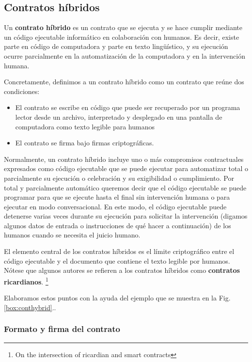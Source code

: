 \documentclass[12pt]{report} %
\begin{document}
\subsection{Contratos híbridos}
\label{hybridcont}

Un  \textbf{contrato híbrido} es un contrato que se ejecuta y se hace cumplir mediante un código ejecutable informático en colaboración con humanos. Es decir, existe parte en  código de computadora y parte en texto lingüístico, y su ejecución ocurre parcialmente en la automatización de la computadora y en la intervención humana.

Concretamente, definimos a un contrato híbrido como un contrato que reúne dos condiciones:

\begin{itemize}
    \item El contrato se escribe en código que puede ser recuperado por un programa lector desde un archivo, interpretado y desplegado en una pantalla de computadora como texto legible para humanos
    \item El contrato se firma bajo firmas criptográficas.
        
\end{itemize}

Normalmente, un contrato híbrido incluye uno o más compromisos contractuales expresados como código ejecutable que se puede ejecutar para automatizar total o parcialmente su ejecución o celebración  y su exigibilidad o cumplimiento. Por total y parcialmente automático queremos decir que el código ejecutable se puede programar para que se ejecute hasta el final sin intervención humana o para ejecutar en modo conversacional. En este modo, el código ejecutable puede detenerse varias veces durante su ejecución para solicitar la intervención (digamos algunos datos de entrada o instrucciones de qué hacer a continuación) de los humanos cuando se necesita el juicio humano.

El elemento central de los contratos híbridos es el límite criptográfico entre el código ejecutable y el documento que contiene el texto legible por humanos. Nótese que algunos autores se refieren a los contratos híbridos como \textbf{contratos ricardianos}. \footnote{\cite{IanGrigg2015} On the intersection of ricardian and smart contracts}

Elaboramos estos puntos con la ayuda del ejemplo que se muestra en la Fig. \ref{box:conthybrid}..



\subsubsection{Formato y firma del contrato}
\end{document}
